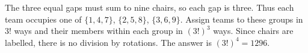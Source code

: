 The three equal gaps must sum to nine chairs, so each gap is three. Thus each team occupies one of $\{1,4,7\}$, $\{2,5,8\}$, $\{3,6,9\}$. Assign teams to these groups in $3!$ ways and their members within each group in $(3!)^3$ ways. Since chairs are labelled, there is no division by rotations. The answer is $\boxed{(3!)^4=1296}$.
